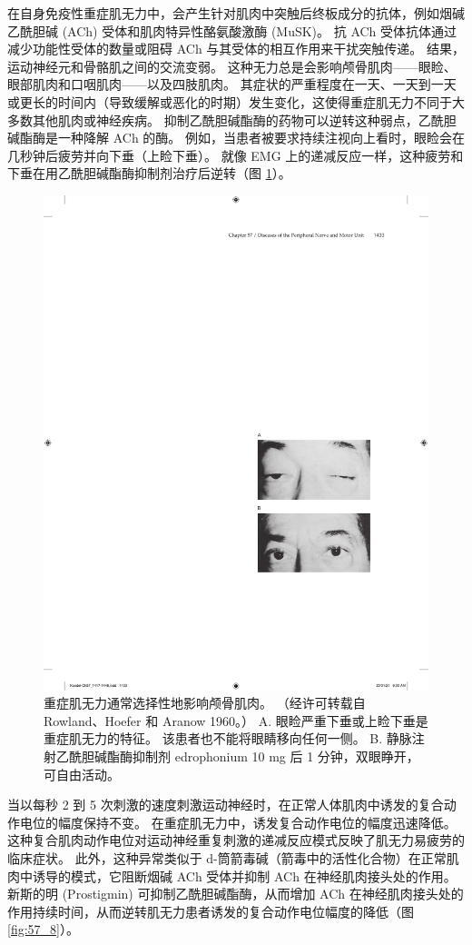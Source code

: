 在自身免疫性重症肌无力中，会产生针对肌肉中突触后终板成分的抗体，例如烟碱乙酰胆碱 (ACh) 受体和肌肉特异性酪氨酸激酶 (MuSK)。 抗 ACh 受体抗体通过减少功能性受体的数量或阻碍 ACh 与其受体的相互作用来干扰突触传递。 结果，运动神经元和骨骼肌之间的交流变弱。 这种无力总是会影响颅骨肌肉——眼睑、眼部肌肉和口咽肌肉——以及四肢肌肉。 其症状的严重程度在一天、一天到一天或更长的时间内（导致缓解或恶化的时期）发生变化，这使得重症肌无力不同于大多数其他肌肉或神经疾病。 抑制乙酰胆碱酯酶的药物可以逆转这种弱点，乙酰胆碱酯酶是一种降解 ACh 的酶。 例如，当患者被要求持续注视向上看时，眼睑会在几秒钟后疲劳并向下垂（上睑下垂）。 就像 EMG 上的递减反应一样，这种疲劳和下垂在用乙酰胆碱酯酶抑制剂治疗后逆转（图 \ref{fig:57_7}）。


\begin{figure}[htbp]
	\centering
	\includegraphics[width=0.45\linewidth]{chap57/fig_57_7}
	\caption{重症肌无力通常选择性地影响颅骨肌肉。 （经许可转载自 Rowland、Hoefer 和 Aranow 1960。） A. 眼睑严重下垂或上睑下垂是重症肌无力的特征。 该患者也不能将眼睛移向任何一侧。 B. 静脉注射乙酰胆碱酯酶抑制剂 edrophonium 10 mg 后 1 分钟，双眼睁开，可自由活动。}
	\label{fig:57_7}
\end{figure}

当以每秒 2 到 5 次刺激的速度刺激运动神经时，在正常人体肌肉中诱发的复合动作电位的幅度保持不变。 在重症肌无力中，诱发复合动作电位的幅度迅速降低。 这种复合肌肉动作电位对运动神经重复刺激的递减反应模式反映了肌无力易疲劳的临床症状。 此外，这种异常类似于 d-筒箭毒碱（箭毒中的活性化合物）在正常肌肉中诱导的模式，它阻断烟碱 ACh 受体并抑制 ACh 在神经肌肉接头处的作用。 新斯的明 (Prostigmin) 可抑制乙酰胆碱酯酶，从而增加 ACh 在神经肌肉接头处的作用持续时间，从而逆转肌无力患者诱发的复合动作电位幅度的降低（图 \ref{fig:57_8}）。

